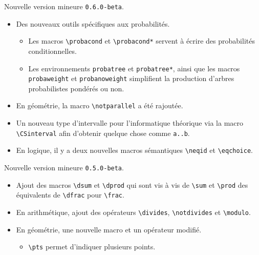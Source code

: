 \documentclass[12pt,a4paper]{article}
\theoremstyle{definition}
\begin{document}
\begin{description}[leftmargin=1em]
    \setlength\itemsep{1em}



    \item[2019-10-10] Nouvelle version mineure \verb+0.6.0-beta+.
    \begin{itemize}
        \item Des nouveaux outils spécifiques aux probabilités.
        \begin{itemize}
            \item Les macros \verb+\probacond+ et \verb+\probacond*+ servent à écrire des probabilités conditionnelles.

            \item Les environnements \verb+probatree+ et \verb+probatree*+, ainsi que les macros \verb+probaweight+ et \verb+probanoweight+ simplifient la production d'arbres probabilistes pondérés ou non.
        \end{itemize}

        \item En géométrie, la macro \verb+\notparallel+ a été rajoutée.

        \item Un nouveau type d'intervalle pour l'informatique théorique via la macro \verb+\CSinterval+ afin d'obtenir quelque chose comme \verb+a..b+.

        \item En logique, il y a deux nouvelles macros sémantiques \verb+\neqid+ et \verb+\eqchoice+.
    \end{itemize}



    \item[2019-09-27] Nouvelle version mineure \verb+0.5.0-beta+.
    \begin{itemize}
        \item Ajout des macros \verb+\dsum+ et \verb+\dprod+ qui sont vis à vis de \verb+\sum+ et \verb+\prod+ des équivalents de \verb+\dfrac+ pour \verb+\frac+.

        \item En arithmétique, ajout des opérateurs \verb+\divides+, \verb+\notdivides+ et \verb+\modulo+.

        \item En géométrie, une nouvelle macro et un opérateur modifié.
        \begin{itemize}
            \item \verb+\pts+ permet d'indiquer plusieurs points.


\end{itemize}
\end{itemize}
\end{description}
\end{document}
